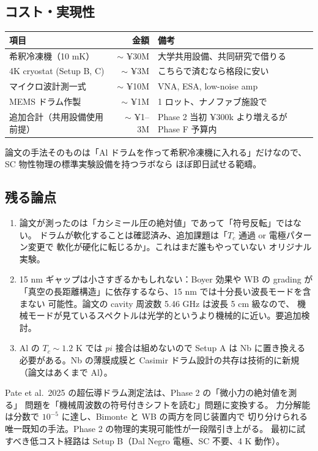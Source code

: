 \documentclass[11pt,a4paper]{article}
\def\pi{pi}%
\def\textbf#1{#1}%
\begin{document}
\subsection{コスト・実現性}

\begin{center}
\begin{tabular}{lrl}
\toprule
項目 & 金額 & 備考 \\
\midrule
希釈冷凍機（10 mK） & $\sim$ ¥30M & 大学共用設備、共同研究で借りる \\
4K cryostat (Setup B, C) & $\sim$ ¥3M & こちらで済むなら格段に安い \\
マイクロ波計測一式 & $\sim$ ¥10M & VNA, ESA, low-noise amp \\
MEMS ドラム作製 & $\sim$ ¥1M & 1 ロット、ナノファブ施設で \\
\midrule
\textbf{追加合計（共用設備使用前提）} & $\sim$ ¥1--3M &
Phase 2 当初 ¥300k より増えるが Phase F 予算内 \\
\bottomrule
\end{tabular}
\end{center}

論文の手法そのものは「Al ドラムを作って希釈冷凍機に入れる」だけなので、
SC 物性物理の標準実験設備を持つラボなら \textbf{ほぼ即日試せる}範疇。

\subsection{残る論点}

\begin{enumerate}
\item 論文が測ったのは「カシミール圧の絶対値」であって「符号反転」ではない。
  ドラムが軟化することは確認済み、追加課題は「$T_c$ 通過 or 電極パターン変更で
  軟化が硬化に転じるか」。これはまだ誰もやっていない \textbf{オリジナル実験}。
\item 15 nm ギャップは小さすぎるかもしれない：Boyer 効果や WB の grading が
  「真空の長距離構造」に依存するなら、15 nm では十分長い波長モードを含まない
  可能性。論文の cavity 周波数 5.46 GHz は波長 5 cm 級なので、
  機械モードが見ているスペクトルは光学的というより機械的に近い。要追加検討。
\item Al の $T_c \sim 1.2$ K では $\pi$ 接合は組めないので Setup A は Nb に置き換える
  必要がある。Nb の薄膜成膜と Casimir ドラム設計の共存は技術的に新規
  （論文はあくまで Al）。
\end{enumerate}

\begin{tcolorbox}[colback=green!5,colframe=green!50!black,title=一行まとめ]
Pate et al.\ 2025 の超伝導ドラム測定法は、Phase 2 の「微小力の絶対値を測る」
問題を「機械周波数の符号付きシフトを読む」問題に変換する。
力分解能は分数で $10^{-5}$ に達し、Bimonte と WB の両方を同じ装置内で
切り分けられる唯一既知の手法。Phase 2 の物理的実現可能性が一段階引き上がる。
最初に試すべき低コスト経路は Setup B（Dal Negro 電極、SC 不要、4 K 動作）。
\end{tcolorbox}
\end{document}
